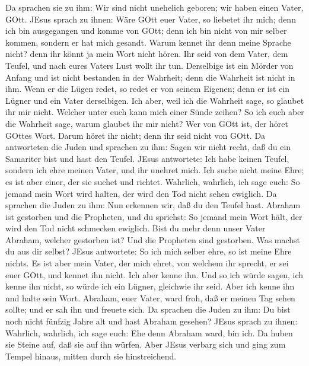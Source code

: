 Da sprachen sie zu ihm: Wir sind nicht unehelich geboren; wir haben
einen Vater, GOtt.  JEsus sprach zu ihnen: Wäre GOtt euer
Vater, so liebetet ihr mich; denn ich bin ausgegangen und komme von
GOtt; denn ich bin nicht von mir selber kommen, sondern er hat mich
gesandt.  Warum kennet ihr denn meine Sprache nicht? denn
ihr könnt ja mein Wort nicht hören.  Ihr seid von dem
Vater, dem Teufel, und nach eures Vaters Lust wollt ihr tun. Derselbige
ist ein Mörder von Anfang und ist nicht bestanden in der Wahrheit; denn
die Wahrheit ist nicht in ihm. Wenn er die Lügen redet, so redet er von
seinem Eigenen; denn er ist ein Lügner und ein Vater derselbigen.
 Ich aber, weil ich die Wahrheit sage, so glaubet ihr mir
nicht.  Welcher unter euch kann mich einer Sünde zeihen? So
ich euch aber die Wahrheit sage, warum glaubet ihr mir nicht?
 Wer von GOtt ist, der höret GOttes Wort. Darum höret ihr
nicht; denn ihr seid nicht von GOtt.  Da antworteten die
Juden und sprachen zu ihm: Sagen wir nicht recht, daß du ein Samariter
bist und hast den Teufel.  JEsus antwortete: Ich habe
keinen Teufel, sondern ich ehre meinen Vater, und ihr unehret mich.
 Ich suche nicht meine Ehre; es ist aber einer, der sie
suchet und richtet.  Wahrlich, wahrlich, ich sage euch: So
jemand mein Wort wird halten, der wird den Tod nicht sehen ewiglich.
 Da sprachen die Juden zu ihm: Nun erkennen wir, daß du den
Teufel hast. Abraham ist gestorben und die Propheten, und du sprichst:
So jemand mein Wort hält, der wird den Tod nicht schmecken ewiglich.
 Bist du mehr denn unser Vater Abraham, welcher gestorben
ist? Und die Propheten sind gestorben. Was machst du aus dir selbst?
 JEsus antwortete: So ich mich selber ehre, so ist meine
Ehre nichts. Es ist aber mein Vater, der mich ehret, von welchem ihr
sprecht, er sei euer GOtt,  und kennet ihn nicht. Ich aber
kenne ihn. Und so ich würde sagen, ich kenne ihn nicht, so würde ich ein
Lügner, gleichwie ihr seid. Aber ich kenne ihn und halte sein Wort.
 Abraham, euer Vater, ward froh, daß er meinen Tag sehen
sollte; und er sah ihn und freuete sich.  Da sprachen die
Juden zu ihm: Du bist noch nicht fünfzig Jahre alt und hast Abraham
gesehen?  JEsus sprach zu ihnen: Wahrlich, wahrlich, ich
sage euch: Ehe denn Abraham ward, bin ich.  Da huben sie
Steine auf, daß sie auf ihn würfen. Aber JEsus verbarg sich und ging zum
Tempel hinaus, mitten durch sie hinstreichend.


